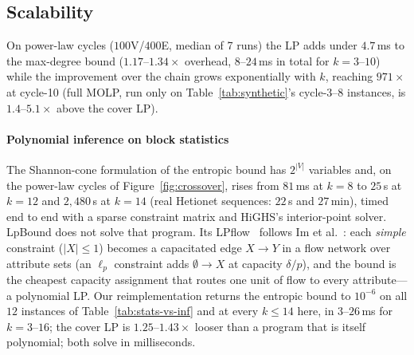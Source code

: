 \documentclass[sigconf, nonacm, acmthm=false]{acmart}
\begin{document}
\subsection{Scalability}
\label{sec:scalability}

On power-law cycles ($100$V/$400$E, median of 7 runs) the
LP adds under $4.7$\,ms to the max-degree bound ($1.17$--$1.34\times$
overhead, $8$--$24$\,ms in total for $k{=}3$--$10$) while the
improvement over the chain grows exponentially with $k$, reaching $971\times$ at
cycle-10 (full MOLP, run only on Table~\ref{tab:synthetic}'s cycle-$3$--$8$ instances, is $1.4$--$5.1\times$ above the cover LP).

\paragraph{Polynomial inference on block statistics}
The Shannon-cone formulation of the entropic bound has $2^{|V|}$
variables and, on the power-law cycles of Figure~\ref{fig:crossover},
rises from $81$\,ms at $k{=}8$ to $25$\,s at $k{=}12$ and $2{,}480$\,s
at $k{=}14$ (real Hetionet sequences: $22$\,s and $27$\,min), timed end
to end with a sparse constraint matrix and HiGHS's interior-point solver. LpBound does not solve that program. Its LPflow~\cite[Thm.~4.5]{zhang2025lpbound}
follows Im et al.~\cite{im2025simple}: each \emph{simple} constraint
($|X| \le 1$) becomes a capacitated edge $X \to Y$ in a flow network
over attribute sets (an $\ell_p$ constraint adds $\emptyset \to X$ at
capacity $\delta/p$), and the bound is the cheapest capacity assignment
that routes one unit of flow to every attribute---a polynomial LP. Our
reimplementation returns the entropic bound to $10^{-6}$ on all $12$
instances of Table~\ref{tab:stats-vs-inf} and at every $k \le 14$
here, in $3$--$26$\,ms for $k{=}3$--$16$; the cover LP is
$1.25$--$1.43\times$ looser than a program that is itself polynomial;
both solve in milliseconds.
\end{document}
